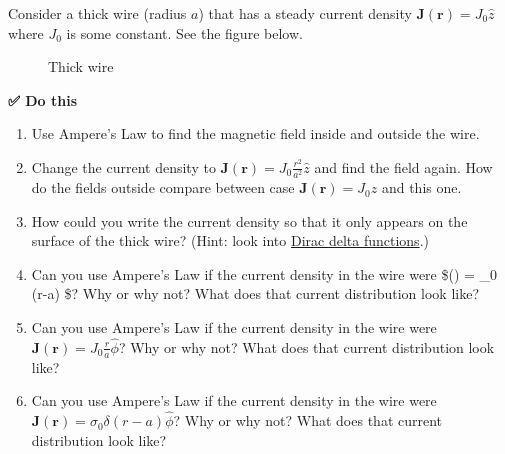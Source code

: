 Consider a thick wire (radius \(a\)) that has a steady current density
\(\mathbf{J}(\mathbf{r}) = J_0 \hat{z}\) where \(J_0\) is some constant.
See the figure below.

\begin{figure}
\centering
{}
\caption{Thick wire}
\end{figure}

\textbf{✅ Do this}

\begin{enumerate}
\def\labelenumi{\arabic{enumi}.}
\tightlist
\item
  Use Ampere's Law to find the magnetic field inside and outside the
  wire.
\item
  Change the current density to
  \(\mathbf{J}(\mathbf{r}) = J_0 \frac{r^2}{a^2} \hat{z}\) and find the
  field again. How do the fields outside compare between case
  \(\mathbf{J}(\mathbf{r}) = J_0 \hat{z}\) and this one.
\item
  How could you write the current density so that it only appears on the
  surface of the thick wire? (Hint: look into
  \href{https://en.wikipedia.org/wiki/Dirac_delta_function}{Dirac delta
  functions}.)
\item
  Can you use Ampere's Law if the current density in the wire were
  \$() = \sigma\_0 \delta(r-a)  \$? Why or
  why not? What does that current distribution look like?
\item
  Can you use Ampere's Law if the current density in the wire were
  \(\mathbf{J}(\mathbf{r}) = J_0\frac{r}{a} \hat{\phi}\)? Why or why
  not? What does that current distribution look like?
\item
  Can you use Ampere's Law if the current density in the wire were
  \(\mathbf{J}(\mathbf{r}) = \sigma_0 \delta(r-a) \hat{\phi}\)? Why or
  why not? What does that current distribution look like?
\end{enumerate}
